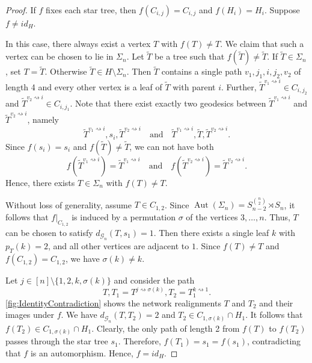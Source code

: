 \documentclass[reqno,dvipsnames]{amsart}
\theoremstyle{plain}
\numberwithin{equation}{section}
\theoremstyle{definition}
\DeclareMathOperator{\Aut}{Aut}
\begin{document}
		\begin{proof}
			If $f$ fixes each star tree, then $f(C_{i,j}) = C_{i,j}$  and $f(H_i) = H_i$. Suppose $f\neq id_H$. 

			In this case, there always exist a vertex $T$ with $f(T) \neq T$. We claim that such a vertex can be chosen to lie in $\Sigma_n$. Let $\tilde{T}$ be a tree such that $f(\tilde{T}) \neq \tilde{T}$. If $\tilde{T}\in \Sigma_n$, set $T = \tilde{T}$. Otherwise $\tilde{T}\in H\setminus \Sigma_n$. Then $\tilde{T}$ contains a single path $v_1, j_1, i, j_2, v_2$ of length 4 and every other vertex is a leaf of $\tilde{T}$ with parent $i$. Further, $\tilde{T}^{v_1\rightsquigarrow i}\in C_{i,j_2}$ and $\tilde{T}^{v_2\rightsquigarrow i}\in C_{i, j_1}$. Note that there exist exactly two geodesics between $\tilde{T}^{v_1\rightsquigarrow i}$ and $\tilde{T}^{v_2\rightsquigarrow i}$, namely
			\[
				\tilde{T}^{v_1\rightsquigarrow i}, s_i, \tilde{T}^{v_2\rightsquigarrow i} \quad \text{and} \quad \tilde{T}^{v_1\rightsquigarrow i}, \tilde{T}, \tilde{T}^{v_2\rightsquigarrow i}.
			\]
			Since $f(s_i) = s_i$ and $f(\tilde{T}) \neq \tilde{T}$, we can not have both
			\[
				f(\tilde{T}^{v_1\rightsquigarrow i}) = \tilde{T}^{v_1\rightsquigarrow i} \quad \text{and} \quad f(\tilde{T}^{v_2\rightsquigarrow i}) = \tilde{T}^{v_2\rightsquigarrow i}.
			\]
			Hence, there exists $T\in \Sigma_n$ with $f(T) \neq T$.

			Without loss of generality, assume $T\in C_{1,2}$. Since $\Aut(\Sigma_n) = S_{n-2}^{\binom{n}{2}} \rtimes S_n$, it follows that $f|_{C_{1,2}}$ is induced by a permutation $\sigma$ of the vertices $3, \ldots, n$. Thus, $T$ can be chosen to satisfy $d_{\mathcal{G}_n} (T, s_1) = 1$. Then there exists a single leaf $k$ with $p_T(k) = 2$, and all other vertices are adjacent to $1$. Since $f(T) \neq T$ and $f(C_{1,2}) = C_{1,2}$, we have $\sigma(k) \neq k$. 
			
			Let $j\in [n]\setminus \{1,2,k,\sigma(k)\}$ and consider the path
			\[
				T, T_1 = T^{j\rightsquigarrow \sigma(k)}, T_2 = T_1^{k\rightsquigarrow 1}.
			\]
			\autoref{fig:IdentityContradiction} shows the network realignments $T$ and $T_2$ and their images under $f$. We have $d_{\mathcal{G}_n} (T, T_2) = 2$ and $T_2 \in C_{1,\sigma(k)} \cap H_1$. It follows that $f(T_2) \in C_{1,\sigma(k)}\cap H_1$. Clearly, the only path of length 2 from $f(T)$ to $f(T_2)$ passes through the star tree $s_1$. Therefore, $f(T_1) = s_1 = f(s_1)$, contradicting that $f$ is an automorphism. Hence, $f = id_H$.
		\end{proof}
\end{document}
